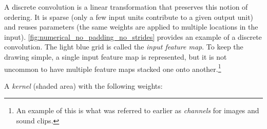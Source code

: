 A discrete convolution is a linear transformation that preserves this notion of
ordering. It is sparse (only a few input units contribute to a given output
unit) and reuses parameters (the same weights are applied to multiple locations
in the input). \autoref{fig:numerical_no_padding_no_strides} provides an
example of a discrete convolution. The light blue grid is called the {\em input
feature map}. To keep the drawing simple, a single input feature map is
represented, but it is not uncommon to have multiple feature maps stacked one
onto another.\footnote{An example of this is what was referred to earlier as
    {\em channels\/} for images and sound clips.}

A {\em kernel\/} (shaded area) with the following weights:

\begin{figure}[H]
    \centering
\end{figure}

